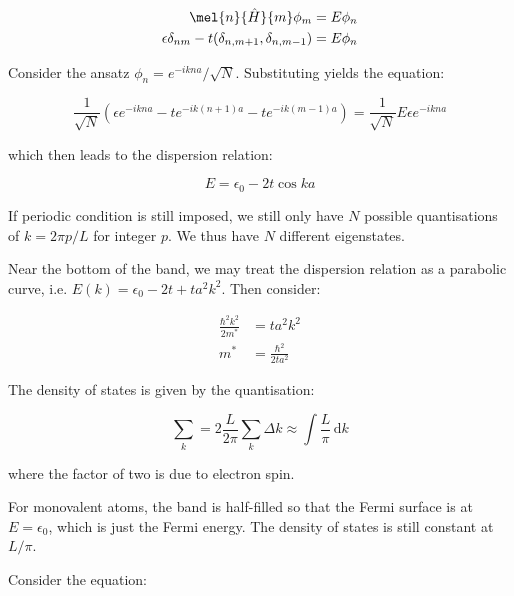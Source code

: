 \documentclass[12pt]{article}
\begin{document}
\begin{equation}
    \begin{split}
        \mel{n}{\hat{H}}{m} \phi_{m} = E \phi_{n} \\
        \epsilon \delta_{nm} - t (\delta_{n, m+1}, \delta_{n, m-1}) = E \phi_{n}
    \end{split}
\end{equation}

Consider the ansatz $\phi_{n} = e^{-ikna}/\sqrt{N}$. Substituting yields the equation:

\begin{equation}
    \frac{1}{\sqrt{N}} \left( \epsilon e^{-ikna} - te^{-ik(n+1)a} - te^{-ik(m-1)a} \right) = \frac{1}{\sqrt{N}} E \epsilon e^{-ikna}
\end{equation}

which then leads to the dispersion relation:

\begin{equation}
    E = \epsilon_{0} - 2t \cos{ka}
\end{equation}

If periodic condition is still imposed, we still only have $N$ possible quantisations of $k = 2\pi p/L$ for integer $p$. We thus have $N$ different eigenstates.

Near the bottom of the band, we may treat the dispersion relation as a parabolic curve, i.e. $E(k) = \epsilon_{0} - 2t + ta^{2}k^{2}$. Then consider:

\begin{equation}
    \begin{split}
        \frac{\hbar^{2}k^{2}}{2m^{*}} &= ta^{2}k^{2} \\
        m^{*} &= \frac{\hbar^{2}}{2ta^{2}}
    \end{split}
\end{equation}

The density of states is given by the quantisation:

\begin{equation}
    \sum_{k} = 2 \frac{L}{2\pi} \sum_{k} \Delta k \approx \int \frac{L}{\pi} \, \mathrm{d}k
\end{equation}

where the factor of two is due to electron spin.

For monovalent atoms, the band is half-filled so that the Fermi surface is at $E = \epsilon_{0}$, which is just the Fermi energy. The density of states is still constant at $L/\pi$.

Consider the equation:
\end{document}
